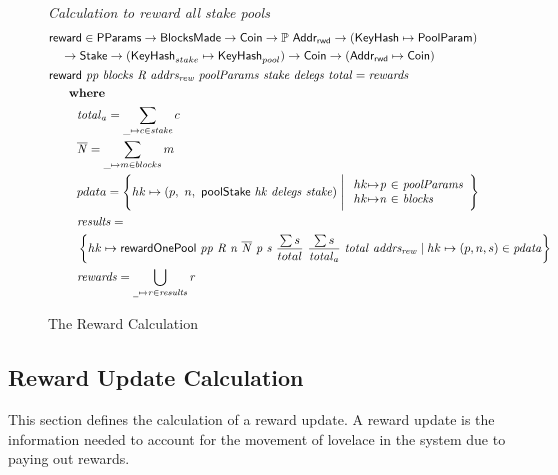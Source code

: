 \begin{figure}[htb]
  \emph{Calculation to reward all stake pools}
  \begin{align*}
      & \fun{reward} \in \PParams \to \BlocksMade \to \Coin\to \powerset{\AddrRWD}
      \to (\KeyHash \mapsto \PoolParam) \\
      & ~~~\to \Stake \to (\KeyHash_{stake} \mapsto \KeyHash_{pool}) \to
      \Coin \to (\AddrRWD \mapsto \Coin)\\
      & \reward{pp}{blocks}{R}{addrs_{rew}}{poolParams}{stake}{delegs}{total}
          = \var{rewards}\\
      & ~~~\where \\
      & ~~~~~~~\var{total}_a = \sum_{\_\mapsto c\in \var{stake}}c \\
      & ~~~~~~~\var{\overline{N}} = \sum_{\_\mapsto m\in blocks}m \\
      & ~~~~~~~pdata = \left\{
        hk\mapsto \left(p,~n,~\poolStake{hk}{delegs}{stake}\right)
        \mathrel{\Bigg|}
        \begin{array}{r@{\mapsto}c@{~\in~}l}
          hk & \var{p} & \var{poolParams} \\
          hk & \var{n} & \var{blocks} \\
        \end{array}
      \right\} \\
      & ~~~~~~~\var{results} = \\
      & ~~~~~~~\left\{
        hk \mapsto \fun{rewardOnePool}~
                     \var{pp}~
                     \var{R}~
                     \var{n}~
                     \var{\overline{N}}~
                     \var{p}~
                     \var{s}~
                     \frac{\sum s}{total}~
                     \frac{\sum s}{\var{total}_a}~
                     \var{total}~
                     \var{addrs_{rew}}
                 \mid
        hk\mapsto(p, n, s)\in\var{pdata} \right\} \\
      & ~~~~~~~\var{rewards} = \bigcup_{\wcard\mapsto\var{r}\in\var{results}}\var{r}
  \end{align*}
  \caption{The Reward Calculation}
  \label{fig:functions:reward-calc}
\end{figure}

\clearpage

\subsection{Reward Update Calculation}
\label{sec:reward-calc}

This section defines the calculation of a reward update.
A reward update is the information needed to account for the movement of lovelace
in the system due to paying out rewards.

